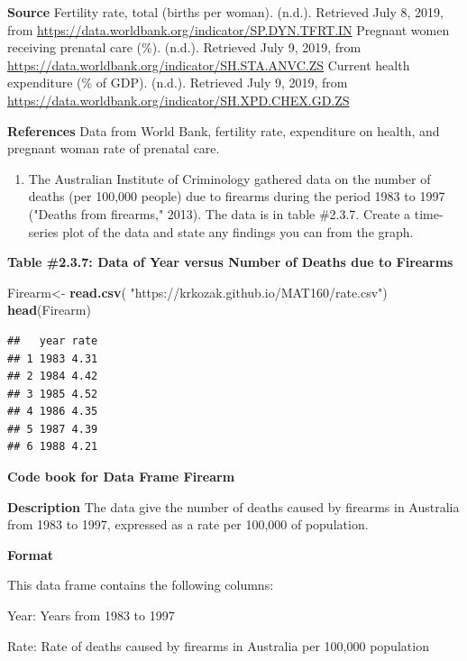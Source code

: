 \documentclass[
]{book}
\newenvironment{Shaded}{\begin{snugshade}}{\end{snugshade}}
\newcommand{\KeywordTok}[1]{\textcolor[rgb]{0.13,0.29,0.53}{\textbf{#1}}}
\newcommand{\NormalTok}[1]{#1}
\newcommand{\StringTok}[1]{\textcolor[rgb]{0.31,0.60,0.02}{#1}}
\providecommand{\tightlist}{%
  \setlength{\itemsep}{0pt}\setlength{\parskip}{0pt}}
\begin{document}
\textbf{Source}
Fertility rate, total (births per woman). (n.d.). Retrieved July 8, 2019, from \url{https://data.worldbank.org/indicator/SP.DYN.TFRT.IN}
Pregnant women receiving prenatal care (\%). (n.d.). Retrieved July 9, 2019, from \url{https://data.worldbank.org/indicator/SH.STA.ANVC.ZS}
Current health expenditure (\% of GDP). (n.d.). Retrieved July 9, 2019, from \url{https://data.worldbank.org/indicator/SH.XPD.CHEX.GD.ZS}

\textbf{References}
Data from World Bank, fertility rate, expenditure on health, and pregnant woman rate of prenatal care.

\begin{enumerate}
\def\labelenumi{\arabic{enumi}.}
\setcounter{enumi}{4}
\tightlist
\item
  The Australian Institute of Criminology gathered data on the number of deaths (per 100,000 people) due to firearms during the period 1983 to 1997 ("Deaths from firearms," 2013). The data is in table \#2.3.7. Create a time-series plot of the data and state any findings you can from the graph.
\end{enumerate}

\textbf{Table \#2.3.7: Data of Year versus Number of Deaths due to Firearms}

\begin{Shaded}
\begin{Highlighting}[]
\NormalTok{Firearm<-}\StringTok{ }\KeywordTok{read.csv}\NormalTok{(}
  \StringTok{"https://krkozak.github.io/MAT160/rate.csv"}\NormalTok{)}
\KeywordTok{head}\NormalTok{(Firearm)}
\end{Highlighting}
\end{Shaded}

\begin{verbatim}
##   year rate
## 1 1983 4.31
## 2 1984 4.42
## 3 1985 4.52
## 4 1986 4.35
## 5 1987 4.39
## 6 1988 4.21
\end{verbatim}

\textbf{Code book for Data Frame Firearm}

\textbf{Description}
The data give the number of deaths caused by firearms in Australia from 1983 to 1997, expressed as a rate per 100,000 of population.

\textbf{Format}

This data frame contains the following columns:

Year: Years from 1983 to 1997

Rate: Rate of deaths caused by firearms in Australia per 100,000 population
\end{document}
